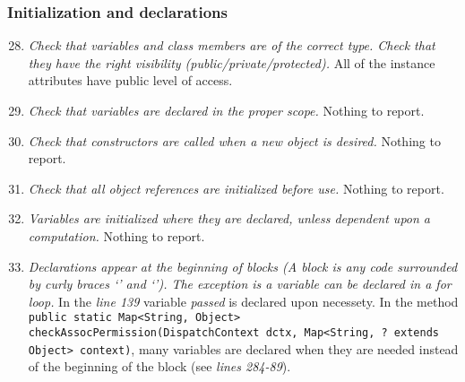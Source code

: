 	\subsubsection{Initialization and declarations}
		\begin{enumerate}
			\setcounter{enumi}{27}
			\item \textit{Check that variables and class members are of the correct type. Check that they have the right visibility (public/private/protected).}\newline
			All of the instance attributes have public level of access. 

			\item \textit{Check that variables are declared in the proper scope.}\newline
			Nothing to report. %

			\item \textit{Check that constructors are called when a new object is desired.}\newline
			Nothing to report. %

			\item \textit{Check that all object references are initialized before use.}\newline
			Nothing to report. %

			\item \textit{Variables are initialized where they are declared, unless dependent upon a computation.}\newline
			Nothing to report. %

			\item \textit{Declarations appear at the beginning of blocks (A block is any code surrounded by curly braces ‘{’ and ‘}’). The exception is a variable can be declared in a for loop.}\newline
			In the \textit{line 139} variable \textit{passed} is declared upon necessety.
			In the method \texttt{public static Map<String, Object> checkAssocPermission(DispatchContext dctx, Map<String, ? extends Object> context)}, many variables are declared when they are needed instead of the beginning of the block (see \textit{lines 284-89}). 

		\end{enumerate}

